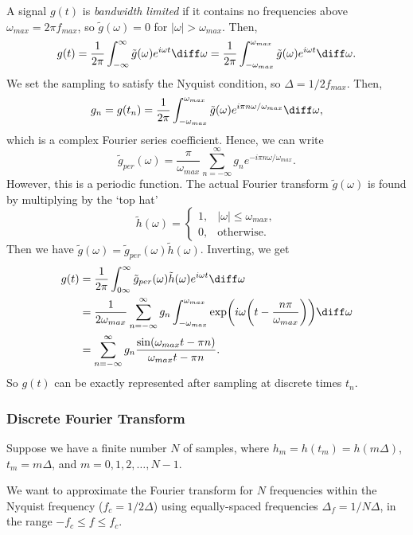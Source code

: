 \documentclass[12pt]{article}
\begin{document}
A signal $g(t)$ is \textit{bandwidth limited} if it contains no frequencies above $\omega_{max} = 2 \pi f_{max}$, so $\tilde g(\omega) = 0$ for $|\omega| > \omega_{max}$. Then,
\[
	g(t) = \frac{1}{2\pi}\int_{-\infty}^{\infty} \tilde g(\omega) e^{i \omega t}\diff \omega = \frac{1}{2 \pi} \int_{- \omega_{max}}^{\omega_{max}} \tilde g(\omega) e^{i \omega t}\diff \omega
.\]
We set the sampling to satisfy the Nyquist condition, so $\Delta = 1/2f_{max}$. Then,
\[
	g_n = g(t_n) = \frac{1}{2\pi} \int_{-\omega_{max}}^{\omega_{max}} \tilde g(\omega) e^{i \pi n \omega/\omega_{max}} \diff \omega
,\]
which is a complex Fourier series coefficient. Hence, we can write
\[
	\tilde g_{per}(\omega) = \frac{\pi}{\omega_{max}} \sum_{n = -\infty}^{\infty} g_n e^{-i\pi n\omega/\omega_{max}}
.\]
However, this is a periodic function. The actual Fourier transform $\tilde g(\omega)$ is found by multiplying by the `top hat'
\[
	\tilde h(\omega) =
	\begin{cases}
		1, & |\omega| \leq \omega_{max}, \\
		0, & \text{otherwise}.
	\end{cases}
\]
Then we have $\tilde g(\omega) = \tilde g_{per}(\omega) \tilde h(\omega)$. Inverting, we get
\begin{align*}
	g(t) &= \frac{1}{2\pi}\int_{0\infty}^{\infty} \tilde g_{per}(\omega) \tilde h(\omega) e^{i\omega t}\diff \omega \\
	     &= \frac{1}{2 \omega_{max}} \sum_{n = -\infty}^{\infty} g_n \int_{-\omega_{max}}^{\omega_{max}}\exp \biggl( i \omega \biggl( t - \frac{n \pi}{\omega_{max}} \biggr) \biggr) \diff \omega \\
	     &= \sum_{n = -\infty}^{\infty} g_n \frac{\sin (\omega_{max} t - \pi n)}{\omega_{max} t - \pi n}.
\end{align*}
So $g(t)$ can be exactly represented after sampling at discrete times $t_n$.

\subsubsection{Discrete Fourier Transform}%
\label{subsub:discrete_fourier_transform}

Suppose we have a finite number $N$ of samples, where $h_m = h(t_m) = h(m \Delta)$, $t_m = m \Delta$, and $m = 0, 1, 2, \ldots, N-1$.

We want to approximate the Fourier transform for $N$ frequencies within the Nyquist frequency ($f_c = 1/2\Delta$) using equally-spaced frequencies $\Delta_f = 1/N\Delta$, in the range $-f_c \leq f \leq f_c$.
\end{document}
